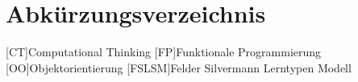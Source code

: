 \clearpage
\section*{Abkürzungsverzeichnis}
\label{sec:abbreviations}

\begin{acronym}[]
    [CT]{Computational Thinking}
    [FP]{Funktionale Programmierung}
    [OO]{Objektorientierung}
    [FSLSM]{Felder Silvermann Lerntypen Modell}
\end{acronym}